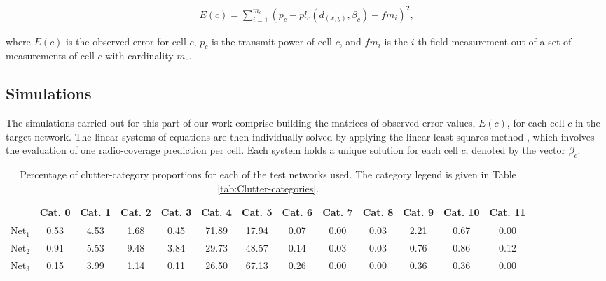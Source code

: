 \begin{multline}
E(c)=\sum_{i=1}^{m_{c}}(p_{c}-pl_{c}(d_{(x,y)},\beta_{c})-fm_{i})^{2},\label{eq:least_squares_error}
\end{multline}


\noindent where $E(c)$ is the observed error for cell $c$, $p_{c}$
is the transmit power of cell $c$, and $fm_{i}$ is the $i$-th field
measurement out of a set of measurements of cell $c$ with cardinality
$m_{c}$.


\subsection{Simulations \label{sub:Simulations}}

The simulations carried out for this part of our work comprise building
the matrices of observed-error values, $E(c)$, for each cell $c$
in the target network. The linear systems of equations are then individually
solved by applying the linear least squares method \cite{Yang_A_linear_least_square_method_of_propagation_model_tuning_for_3G_radion_network_planning:2008},
which involves the evaluation of one radio-coverage prediction per
cell. Each system holds a unique solution for each cell $c$, denoted
by the vector $\beta_{c}$.

\begin{table*}
\caption{Percentage of clutter-category proportions for each of the test networks
used. The category legend is given in Table \ref{tab:Clutter-categories}.
\label{tab:Proportion_of_clutter_for_test_networks}}


{\footnotesize \centering}{\footnotesize \par}

{\footnotesize }%
\begin{tabular}{ccccccccccccc}
\hline 
 & {\footnotesize Cat. 0} & {\footnotesize Cat. 1} & {\footnotesize Cat. 2} & {\footnotesize Cat. 3} & {\footnotesize Cat. 4} & {\footnotesize Cat. 5} & {\footnotesize Cat. 6} & {\footnotesize Cat. 7} & {\footnotesize Cat. 8} & {\footnotesize Cat. 9} & {\footnotesize Cat. 10} & {\footnotesize Cat. 11}\tabularnewline
\hline 
{\footnotesize Net$_{1}$ } & {\footnotesize 0.53} & {\footnotesize 4.53} & {\footnotesize 1.68} & {\footnotesize 0.45} & {\footnotesize 71.89} & {\footnotesize 17.94} & {\footnotesize 0.07} & {\footnotesize 0.00} & {\footnotesize 0.03} & {\footnotesize 2.21} & {\footnotesize 0.67} & {\footnotesize 0.00}\tabularnewline
{\footnotesize Net$_{2}$ } & {\footnotesize 0.91} & {\footnotesize 5.53} & {\footnotesize 9.48} & {\footnotesize 3.84} & {\footnotesize 29.73} & {\footnotesize 48.57} & {\footnotesize 0.14} & {\footnotesize 0.03} & {\footnotesize 0.03} & {\footnotesize 0.76} & {\footnotesize 0.86} & {\footnotesize 0.12}\tabularnewline
{\footnotesize Net$_{3}$ } & {\footnotesize 0.15} & {\footnotesize 3.99} & {\footnotesize 1.14} & {\footnotesize 0.11} & {\footnotesize 26.50} & {\footnotesize 67.13} & {\footnotesize 0.26} & {\footnotesize 0.00} & {\footnotesize 0.00} & {\footnotesize 0.36} & {\footnotesize 0.36} & {\footnotesize 0.00}\tabularnewline
\hline 
\end{tabular}
\end{table*}


